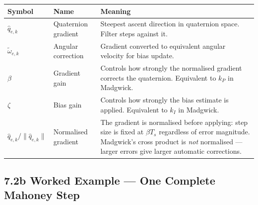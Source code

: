 \documentclass[12pt, a4paper]{article}
\begin{document}
\begin{center}
\begin{tabular}{@{} l p{3.0cm} p{7.4cm} @{}}
  \toprule
  Symbol & Name & Meaning \\
  \midrule
  $\hat{q}_{e,k}$ & Quaternion gradient &
    Steepest ascent direction in quaternion space.
    Filter steps against it. \\[3pt]
  $\tilde{\omega}_{e,k}$ & Angular correction &
    Gradient converted to equivalent angular velocity for bias update. \\[3pt]
  $\beta$ & Gradient gain &
    Controls how strongly the normalised gradient corrects the quaternion.
    Equivalent to $k_P$ in Madgwick. \\[3pt]
  $\zeta$ & Bias gain &
    Controls how strongly the bias estimate is applied.
    Equivalent to $k_I$ in Madgwick. \\[3pt]
  $\hat{q}_{e,k}/\|\hat{q}_{e,k}\|$ & Normalised gradient &
    The gradient is normalised before applying: step size is fixed at
    $\beta T_s$ regardless of error magnitude.
    Madgwick's cross product is \emph{not} normalised --- larger errors
    give larger automatic corrections. \\
  \bottomrule
\end{tabular}
\end{center}

\subsection*{7.2b \quad Worked Example --- One Complete Mahoney Step}
\end{document}
